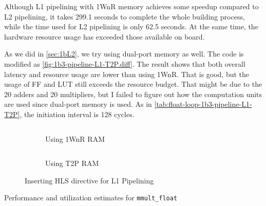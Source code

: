 Although L1 pipelining with 1WnR memory achieves some speedup compared to L2 pipelining, it takes 299.1 seconds to complete the whole building process, while the time used for L2 pipelining is only 62.5 seconds.
At the same time, the hardware resource usage has exceeded those available on board.

As we did in \autoref{sec:1bL2}, we try using dual-port memory as well.
The code is modified as \autoref{fig:1b3-pipeline-L1-T2P.diff}.
The result shows that both overall latency and resource usage are lower than using 1WnR.
That is good, but the usage of FF and LUT still exceeds the resource budget.
That might be due to the 20 adders and 20 multipliers, but I failed to figure out how the computation units are used since dual-port memory is used.
As in \autoref{tab:float-loop-1b3-pipeline-L1-T2P}, the initiation interval is 128 cycles.


\begin{figure}[ht!]

    \begin{subfigure}{\textwidth}
        \centering
        \inputminted[firstline=3]{diff}{program/1b3-pipeline-L1-1WnR.diff}
        \caption{Using 1WnR RAM}
        \label{fig:1b3-pipeline-L1-1WnR.diff}
    \end{subfigure}

    \begin{subfigure}{\textwidth}
        \centering
        \inputminted[firstline=3]{diff}{program/1b3-pipeline-L1-T2P.diff}
        \caption{Using T2P RAM}
        \label{fig:1b3-pipeline-L1-T2P.diff}
    \end{subfigure}

    \caption{Inserting HLS directive for L1 Pipelining}

\end{figure}


\begin{table}
    \caption{Performance and utilization estimates for \texttt{mmult\_float}}\label{tab:float-summary}
    
\end{table}

